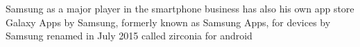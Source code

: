 Samsung as a major player in the smartphone business has also his own app store \cite{comscoreMarket}
Galaxy Apps by Samsung, formerly known as Samsung Apps, for devices by Samsung
renamed in July 2015
called zirconia for android
\cite{samsungZirconia}
%
